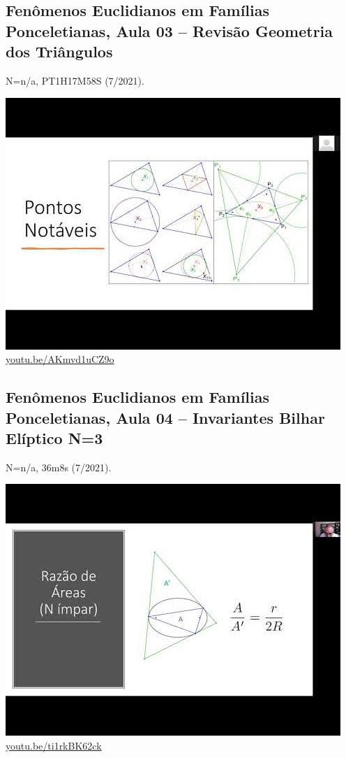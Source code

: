 \documentclass[12pt]{amsart}
\begin{document}
\subsection{Fenômenos Euclidianos em Famílias Ponceletianas, Aula 03 -- Revisão Geometria dos Triângulos}
\label{vid:AKmvd1uCZ9o}
\noindent N=n/a, PT1H17M58S (7/2021). 
\begin{center}\includegraphics[width=.5\textwidth]{pics/AKmvd1uCZ9o.jpg} \\ 
\href{https://youtu.be/AKmvd1uCZ9o}{\url{youtu.be/AKmvd1uCZ9o}}\end{center}
% 

\subsection{Fenômenos Euclidianos em Famílias Ponceletianas, Aula 04 -- Invariantes Bilhar Elíptico N=3}
\label{vid:ti1rkBK62ck}
\noindent N=n/a, 36m8s (7/2021). 
\begin{center}\includegraphics[width=.5\textwidth]{pics/ti1rkBK62ck.jpg} \\ 
\href{https://youtu.be/ti1rkBK62ck}{\url{youtu.be/ti1rkBK62ck}}\end{center}
% 
\end{document}
